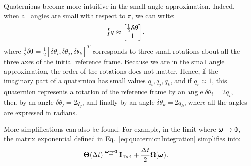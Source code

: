 Quaternions become more intuitive in the small angle approximation. Indeed, when all angles are small with respect to $\pi$, we can write:
\begin{equation}
{}_{I}^{L}\bar{q} \approx \begin{bmatrix}  \frac{1}{2}\delta\boldsymbol{\theta} \\ 1 \end{bmatrix},
\end{equation}
where $\frac{1}{2}\delta\boldsymbol{\theta} = \frac{1}{2}[\delta\theta_i,  \delta\theta_j, \delta\theta_k]^T$ corresponds to three small rotations about all the three axes of the initial reference frame. Because we are in the small angle approximation, the order of the rotations does not matter. Hence, if the imaginary part of a quaternion has small values $q_i, q_j, q_k$, and if $q_r\approx 1$, this quaternion represents a rotation of the reference frame by an angle $\delta\theta_i = 2q_i$, then by an angle $\delta\theta_j = 2q_j$, and finally by an angle $\delta\theta_k = 2q_k$, where all the angles are expressed in radians.

More simplifications can also be found. For example, in the limit where $\boldsymbol\omega \to \boldsymbol{0}$, the matrix exponential defined in Eq.~\ref{eq:quaternionIntegration} simplifies into:
\begin{equation}
\boldsymbol\Theta(\Delta t) \stackrel{\boldsymbol\omega \to \boldsymbol{0}}{=} \textrm{\textbf{I}}_{4\times 4} + \frac{\Delta t}{2}\boldsymbol\Omega(\boldsymbol\omega).
\label{eq:quaternionIntegrationSimple}
\end{equation}



